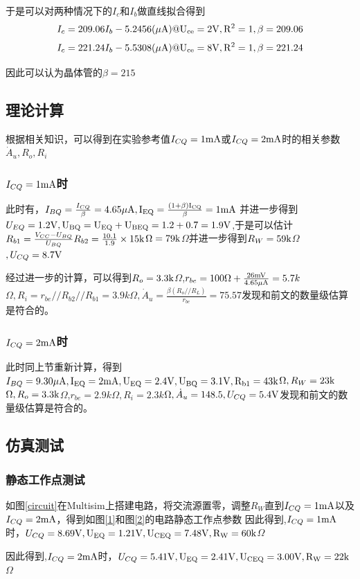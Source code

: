 \documentclass[UTF8,a4paper]{ctexart}
\begin{document}
于是可以对两种情况下的$I_c$和$I_b$做直线拟合得到
$$I_c=209.06I_b-5.2456(\rm{\mu A})@U_{ce}=2\rm{V},R^2=1,\beta=209.06$$
$$I_c=221.24I_b-5.5308(\rm{\mu A})@U_{ce}=8\rm{V},R^2=1,\beta=221.24$$

因此可以认为晶体管的$\beta=215$
\subsection{理论计算}
根据相关知识，可以得到在实验参考值$I_{CQ}=1\rm{mA}$或$I_{CQ}=2\rm{mA}$时的相关参数$\dot{A}_u,R_o,R_i$
\subsubsection{$I_{CQ}=1\rm{mA}$时}
此时有，$I_{BQ}=\frac{I_{CQ}}{\beta}=4.65\rm{\mu A},I_{EQ}=\frac{(1+\beta)I_{CQ}}{\beta}=1\rm{mA}$ 并进一步得到$U_{EQ}=1.2\rm{V},U_{BQ}=U_{EQ}+U_{BEQ}=1.2+0.7=1.9\rm{V}$,于是可以估计$R_{b1}=\frac{V_{CC}-U_{BQ}}{U_{BQ}}R_{b2}=\frac{10.1}{1.9}\times15\rm{k}$$\Omega=79\rm{k}$$\Omega$并进一步得到$R_W=59\rm{k}$$\Omega$$,U_{CQ}=8.7\rm{V}$

经过进一步的计算，可以得到$R_o=3.3\rm{k}$$\Omega$,$r_{be}=100\Omega+\frac{26\rm{mV}}{4.65\rm{\mu A}}=5.7k$$\Omega,R_i=r_{be}//R_{b2}//R_{b1}=3.9k$$\Omega,\dot{A}_u=\frac{\beta(R_o//R_L)}{r_{be}}=75.57$发现和前文的数量级估算是符合的。
\subsubsection{$I_{CQ}=2\rm{mA}$时}
此时同上节重新计算，得到$I_{BQ}=9.30\rm{\mu A},I_{EQ}=2\rm{mA},U_{EQ}=2.4\rm{V},U_{BQ}=3.1\rm{V},R_{b1}=43\rm{k}$$\Omega,R_W=23\rm{k}$$\Omega,R_o=3.3\rm{k}$$\Omega$,$r_{be}=2.9k$$\Omega,R_i=2.3k$$\Omega,\dot{A}_u=148.5,U_{CQ}=5.4\rm{V}$发现和前文的数量级估算是符合的。
\subsection{仿真测试}
\subsubsection{静态工作点测试}
如图\ref{circuit}在Multisim上搭建电路，将交流源置零，调整$R_W$直到$I_{CQ}=1\rm{mA}$以及$I_{CQ}=2\rm{mA}$，得到如图\ref{1}和图\ref{2}的电路静态工作点参数
因此得到,$I_{CQ}=1\rm{mA}$时，$U_{CQ}=8.69\rm{V},U_{EQ}=1.21\rm{V},U_{CEQ}=7.48\rm{V},R_W=60k$$\Omega$

因此得到,$I_{CQ}=2\rm{mA}$时，$U_{CQ}=5.41\rm{V},U_{EQ}=2.41\rm{V},U_{CEQ}=3.00\rm{V},R_W=22k$$\Omega$
\end{document}
